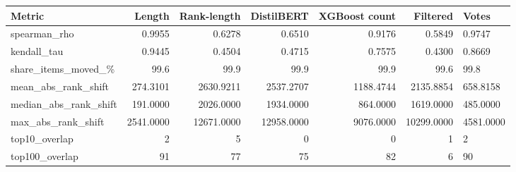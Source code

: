 \begin{tabular}{lrrrrr}
\hline
Metric & Length & Rank-length & DistilBERT & XGBoost count & Filtered & Votes \\
\hline
spearman\_rho & 0.9955 & 0.6278 & 0.6510 & 0.9176 & 0.5849 & 0.9747 \\
\hline
kendall\_tau & 0.9445 & 0.4504 & 0.4715 & 0.7575 & 0.4300 & 0.8669 \\
\hline
share\_items\_moved\_\% & 99.6 & 99.9 & 99.9 & 99.9 & 99.6 & 99.8 \\
\hline
mean\_abs\_rank\_shift & 274.3101 & 2630.9211 & 2537.2707 & 1188.4744 & 2135.8854 & 658.8158 \\
\hline
median\_abs\_rank\_shift & 191.0000 & 2026.0000 & 1934.0000 & 864.0000 & 1619.0000 & 485.0000 \\
\hline
max\_abs\_rank\_shift & 2541.0000 & 12671.0000 & 12958.0000 & 9076.0000 & 10299.0000 & 4581.0000 \\
\hline
top10\_overlap & 2 & 5 & 0 & 0 & 1 & 2 \\
\hline
top100\_overlap & 91 & 77 & 75 & 82 & 6 & 90 \\
\hline
\end{tabular}

